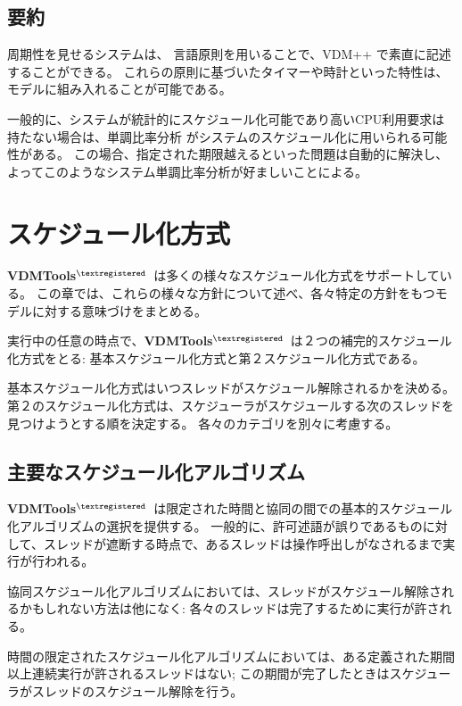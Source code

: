 \documentclass[\pformat,12pt]{jreport}
\newcommand{\vdmtools}{\textbf{VDMTools}$^{\mathbf{{\textregistered}}}$}
\begin{document}
\section{要約}

周期性を見せるシステムは、 言語原則を用いることで、VDM++ で素直に記述することができる。
これらの原則に基づいたタイマーや時計といった特性は、モデルに組み入れることが可能である。

一般的に、システムが統計的にスケジュール化可能であり高いCPU利用要求は持たない場合は、単調比率分析 \cite{Audsley&93,Burns95} がシステムのスケジュール化に用いられる可能性がある。
この場合、指定された期限越えるといった問題は自動的に解決し、よってこのようなシステム単調比率分析が好ましいことによる。


\chapter{スケジュール化方式} \label{chap:schedule}

\vdmtools\ は多くの様々なスケジュール化方式をサポートしている。
この章では、これらの様々な方針について述べ、各々特定の方針をもつモデルに対する意味づけをまとめる。

実行中の任意の時点で、\vdmtools\ は２つの補完的スケジュール化方式をとる: 基本スケジュール化方式と第２スケジュール化方式である。

基本スケジュール化方式はいつスレッドがスケジュール解除されるかを決める。
第２のスケジュール化方式は、スケジューラがスケジュールする次のスレッドを見つけようとする順を決定する。
各々のカテゴリを別々に考慮する。

\section{主要なスケジュール化アルゴリズム}

\vdmtools\ は限定された時間と協同の間での基本的スケジュール化アルゴリズムの選択を提供する。
一般的に、許可述語が誤りであるものに対して、スレッドが遮断する時点で、あるスレッドは操作呼出しがなされるまで実行が行われる。

協同スケジュール化アルゴリズムにおいては、スレッドがスケジュール解除されるかもしれない方法は他になく: 各々のスレッドは完了するために実行が許される。

時間の限定されたスケジュール化アルゴリズムにおいては、ある定義された期間以上連続実行が許されるスレッドはない; この期間が完了したときはスケジューラがスレッドのスケジュール解除を行う。
\end{document}

